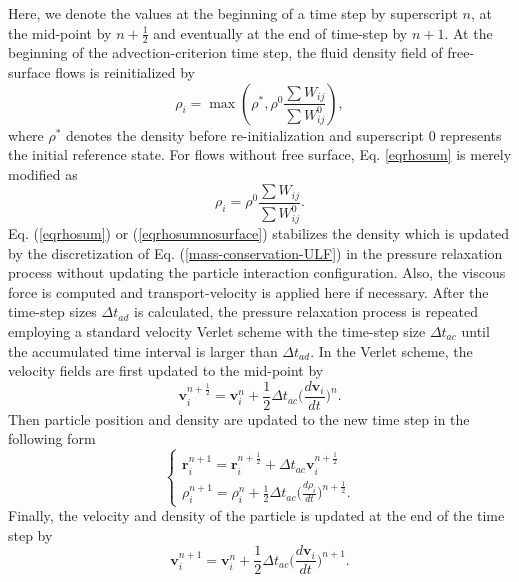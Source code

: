 \documentclass[12pt, a4paper,onecolumn]{article}
\begin{document}
Here, we denote the values at the beginning of a time step by superscript $n$, 
at the mid-point by $n + \frac{1}{2}$ and eventually at the end of time-step by $n + 1$.
At the beginning of the advection-criterion time step, the fluid density field of free-surface flows is reinitialized by
\begin{equation} \label{eqrhosum}
\rho_i = \max\left(\rho^*, \rho^0 \frac{ \sum W_{ij}}{\sum W^0_{ij}}\right) ,
\end{equation}
where $\rho^*$ denotes the density before re-initialization and superscript $0$ represents the initial reference state.
For flows without free surface, Eq.  \ref{eqrhosum} is merely modified as 
\begin{equation} \label{eqrhosumnosurface}
\rho_i =  \rho^0 \frac{ \sum W_{ij}}{\sum W^0_{ij}} .
\end{equation}
Eq. (\ref{eqrhosum}) or (\ref{eqrhosumnosurface}) stabilizes the density 
which is updated by the discretization of Eq. (\ref{mass-conservation-ULF}) 
in the pressure relaxation process without updating the particle interaction configuration.
Also, the viscous force is computed and transport-velocity is applied here if necessary.
After the time-step sizes $\Delta t_{ad}$ is calculated, 
the pressure relaxation process is repeated 
employing a standard velocity Verlet scheme
with the time-step size $\Delta t_{ac}$ until the accumulated time interval is larger than $\Delta t_{ad}$. 
In the Verlet scheme, the velocity fields are first updated to the mid-point by
%
\begin{equation}\label{verlet-first-half}
\mathbf{v}_i^{n + \frac{1}{2}} = \mathbf{v}_i^n + \frac{1}{2}\Delta t_{ac} \big( \frac{d \mathbf{v}_i}{dt} \big)^{n}.
\end{equation}
%
Then particle position and density are updated to the new time step in the following form
%
\begin{equation}\label{verlet-first-mediate}
\begin{cases}
\mathbf{r}_i^{n + 1} = \mathbf{r}_i^{n + \frac{1}{2}} +  \Delta t_{ac} \mathbf{v}_i^{n +\frac{1}{2}} \\
\rho_i^{n + 1} = \rho_i^{n} + \frac{1}{2} \Delta t_{ac} \big( \frac{d \rho_i}{dt} \big)^{n+\frac{1}{2}}.
\end{cases}
\end{equation}
%
Finally, the velocity and density of the particle is updated at the end of the time step by 
%
\begin{equation}\label{verlet-first-final}
\mathbf{v}_i^{n + 1} = \mathbf{v}_i^n +  \frac{1}{2} \Delta t_{ac} \big( \frac{d \mathbf{v}_i}{dt} \big)^{n + 1}.
\end{equation}
%
\end{document}
